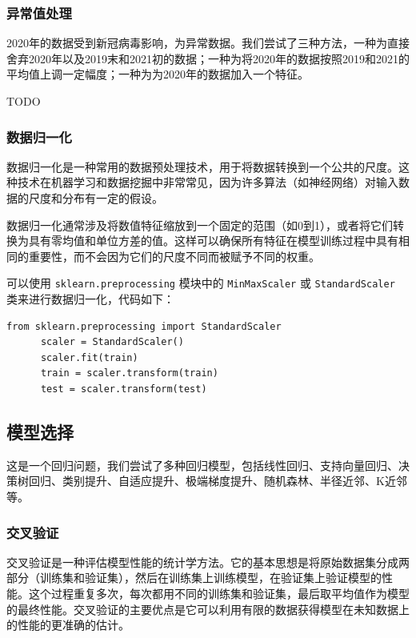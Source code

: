 \documentclass{ctexart}
\begin{document}
\subsubsection{异常值处理}
2020年的数据受到新冠病毒影响，为异常数据。我们尝试了三种方法，一种为直接舍弃2020年以及2019末和2021初的数据；一种为将2020年的数据按照2019和2021的平均值上调一定幅度；一种为为2020年的数据加入一个特征。

TODO

\subsubsection{数据归一化}

数据归一化是一种常用的数据预处理技术，用于将数据转换到一个公共的尺度。这种技术在机器学习和数据挖掘中非常常见，因为许多算法（如神经网络）对输入数据的尺度和分布有一定的假设。

数据归一化通常涉及将数值特征缩放到一个固定的范围（如0到1），或者将它们转换为具有零均值和单位方差的值。这样可以确保所有特征在模型训练过程中具有相同的重要性，而不会因为它们的尺度不同而被赋予不同的权重。

可以使用 \texttt{sklearn.preprocessing} 模块中的 \texttt{MinMaxScaler} 或 \texttt{StandardScaler} 类来进行数据归一化，代码如下：

\begin{lstlisting}[style=Python]
      from sklearn.preprocessing import StandardScaler
      scaler = StandardScaler()
      scaler.fit(train)
      train = scaler.transform(train)
      test = scaler.transform(test)
\end{lstlisting}

\subsection{模型选择}

这是一个回归问题，我们尝试了多种回归模型，包括线性回归、支持向量回归、决策树回归、类别提升、自适应提升、极端梯度提升、随机森林、半径近邻、K近邻等。

\subsubsection{交叉验证}

交叉验证是一种评估模型性能的统计学方法。它的基本思想是将原始数据集分成两部分（训练集和验证集），然后在训练集上训练模型，在验证集上验证模型的性能。这个过程重复多次，每次都用不同的训练集和验证集，最后取平均值作为模型的最终性能。交叉验证的主要优点是它可以利用有限的数据获得模型在未知数据上的性能的更准确的估计。
\end{document}
